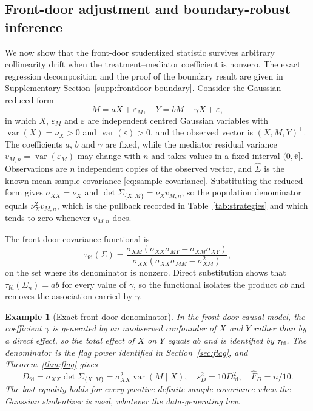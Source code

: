 \documentclass[12pt,a4paper]{article}
\theoremstyle{plain}
\newtheorem{example}{Example}
\theoremstyle{definition}
\newcommand{\var}{\operatorname{var}}
\newcommand{\eps}{\varepsilon}
\newcommand{\Sighat}{\hat{\Sigma}}
\newcommand{\FD}{\widehat{F}_D}
\begin{document}
\subsection{Front-door adjustment and boundary-robust inference}
We now show that the front-door studentized statistic survives arbitrary collinearity drift when the treatment--mediator coefficient is nonzero.
The exact regression decomposition and the proof of the boundary result are given in Supplementary Section~\ref{supp:frontdoor-boundary}.
Consider the Gaussian reduced form
\begin{equation}
\label{eq:frontdoor-model}
    M
    =
    aX+\eps_M
    ,\quad
    Y
    =
    bM+\gamma X+\eps
    ,
\end{equation}
in which $X$, $\eps_M$ and $\eps$ are independent centred Gaussian variables with $\var(X)=\nu_X>0$ and $\var(\eps)>0$, and the observed vector is $(X,M,Y)^\top$.
The coefficients $a$, $b$ and $\gamma$ are fixed, while the mediator residual variance $v_{M,n}=\var(\eps_M)$ may change with $n$ and takes values in a fixed interval $(0,\bar{v}]$.
Observations are $n$ independent copies of the observed vector, and $\Sighat$ is the known-mean sample covariance \eqref{eq:sample-covariance}.
Substituting the reduced form gives $\sigma_{XX}=\nu_X$ and $\det\Sigma_{\{X,M\}}=\nu_Xv_{M,n}$, so the population denominator equals $\nu_X^2v_{M,n}$, which is the pullback recorded in Table~\ref{tab:strategies} and which tends to zero whenever $v_{M,n}$ does.

The front-door covariance functional is
\begin{equation}
\label{eq:frontdoor-functional}
    \tau_{\mathrm{fd}}(\Sigma)
    =
    \frac{
    \sigma_{XM}(\sigma_{XX}\sigma_{MY}-\sigma_{XM}\sigma_{XY})
    }{
    \sigma_{XX}(\sigma_{XX}\sigma_{MM}-\sigma_{XM}^2)
    }
    ,
\end{equation}
on the set where its denominator is nonzero.
Direct substitution shows that $\tau_{\mathrm{fd}}(\Sigma_n)=ab$ for every value of $\gamma$, so the functional isolates the product $ab$ and removes the association carried by $\gamma$.

\begin{example}[Exact front-door denominator]
\label{ex:frontdoor-pivot}
    In the front-door causal model, the coefficient $\gamma$ is generated by an unobserved confounder of $X$ and $Y$ rather than by a direct effect, so the total effect of $X$ on $Y$ equals $ab$ and is identified by $\tau_{\mathrm{fd}}$.
    The denominator is the flag power identified in Section~\ref{sec:flag}, and Theorem~\ref{thm:flag} gives
    \begin{equation}
    \label{eq:frontdoor-pivot}
        D_{\mathrm{fd}}
        =
        \sigma_{XX}\det\Sigma_{\{X,M\}}
        =
        \sigma_{XX}^2\var(M\mid X)
        ,\quad
        s_D^2
        =
        10D_{\mathrm{fd}}^2
        ,\quad
        \FD
        =
        n/10
        .
    \end{equation}
    The last equality holds for every positive-definite sample covariance when the Gaussian studentizer is used, whatever the data-generating law.
\end{example}
\end{document}
